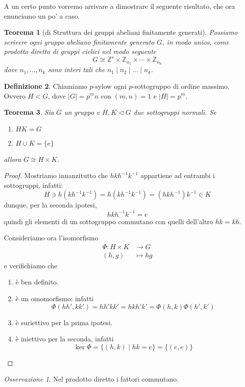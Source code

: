 \documentclass[a4paper]{article}
\newtheorem{theorem}{Teorema}[section]
\theoremstyle{remark}
\newtheorem*{remark}{Osservazione}
\theoremstyle{definition}
\newtheorem{definition}[theorem]{Definizione}
\newcommand{\fun}[5]{\begin{align*}
	#1 \colon #2 &\to #3 \\
	#4 &\mapsto #5
	\end{align*}}
\begin{document}
\begin{multicols}{2}
A un certo punto vorremo arrivare a dimostrare il seguente risultato, che ora enunciamo un po' a caso.
\begin{theorem}[di Struttura dei gruppi abeliani finitamente generati]
 Possiamo scrivere ogni gruppo abeliano finitamente generato $G$, in modo unico, come prodotto diretto di gruppi ciclici nel modo seguente
 \[ G \cong \mathbb{Z}^r \times \mathbb{Z}_{n_1} \times \cdots \times \mathbb{Z}_{n_k} \]
 dove $n_1, \dots, n_k$ sono interi tali che $n_1 \mid n_2 \mid \dots \mid n_k $. 
\end{theorem}

\begin{definition}
	Chiamiamo $ p $-sylow ogni $ p $-sottogruppo di ordine massimo. Ovvero $ H < G $, dove $ |G| = p^mn $ con $ (m, n) = 1 $ e $ |H| = p^m $.
\end{definition}

\begin{theorem}{\label{struttura}}
	Sia $ G $ un gruppo e $ H, K \lhd G $ due sottogruppi normali. Se
	\begin{enumerate}
		\item $ HK = G $
		\item $ H \cup K = \{e\} $
	\end{enumerate}
allora $ G \cong H \times K $.
\end{theorem}
\begin{proof}
	Mostriamo innanzitutto che $ hkh^{-1}k^{-1} $ appartiene ad entrambi i sottogruppi, infatti:
	\[ H  \ni h(kh^{-1}k^{-1}) = h(kh^{-1}k^{-1}) = (hkh^{-1})k^{-1} \in K \]
	dunque, per la seconda ipotesi, $$ hkh^{-1}k^{-1} = e $$ quindi gli elementi di un sottogruppo commutano con quelli dell'altro $ hk = kh $.
	
	Consideriamo ora l'isomorfismo \fun{\Phi}{H\times K}{G}{(h,g)}{hg}
	e verifichiamo che
	\begin{enumerate}
		\item è ben definito.
		\item è un omomorfismo: infatti \[ \Phi(hh', kk') = hh'kk' = hkh'k' = \Phi(h, k)\Phi(h',k') \]
		\item è suriettivo per la prima ipotesi.
		\item è iniettivo per la seconda, infatti \[ \ker\Phi = \{ (h, k) \mid hk = e \} = \{ (e, e) \} \]
	\end{enumerate}
\end{proof}

\begin{remark}
	Nel prodotto diretto i fattori commutano.
\end{remark}


\end{multicols}
\end{document}
